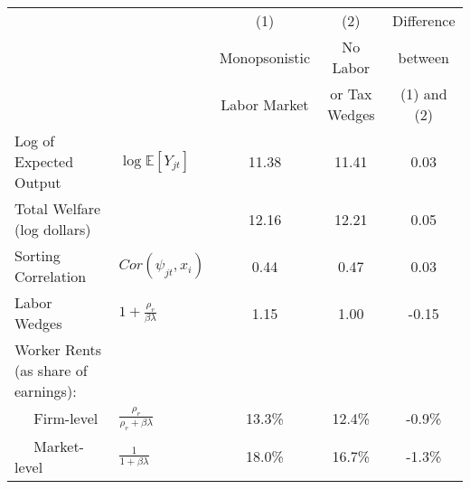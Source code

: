 \begin{tabular}{llccc}
\toprule 
\midrule 
 &   & (1) & (2) & Difference \\
 &   & Monopsonistic & No Labor & between \\
  &   & Labor Market & or Tax Wedges & (1) and (2) \\
\midrule 
Log of Expected Output & $\log \mathbb{E}[Y_{jt}]$ & 11.38 & 11.41 & 0.03 \\
Total Welfare (log dollars) &   & 12.16 & 12.21 & 0.05 \\
Sorting Correlation & $Cor(\psi_{jt},x_i)$ & 0.44 & 0.47 & 0.03 \\
Labor Wedges & $1+\frac{\rho_r}{\beta \lambda}$ & 1.15 & 1.00 & -0.15 \\
Worker Rents (as share of earnings): \\
$\quad$ Firm-level & $\frac{\rho_r}{\rho_r+\beta\lambda}$ & 13.3\% & 12.4\% & -0.9\% \\
$\quad$ Market-level & $\frac{1}{1+\beta\lambda}$ & 18.0\% & 16.7\% & -1.3\% \\
\midrule 
\bottomrule 
\end{tabular}
